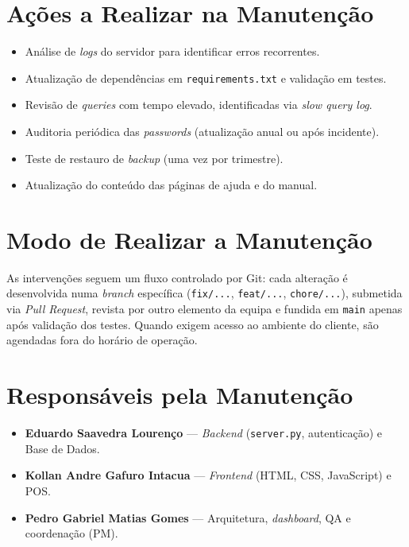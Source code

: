 \documentclass[11pt,a4paper]{report}
\begin{document}
\section{Ações a Realizar na Manutenção}
\begin{itemize}
  \item Análise de \textit{logs} do servidor para identificar erros recorrentes.
  \item Atualização de dependências em \texttt{requirements.txt} e validação em testes.
  \item Revisão de \textit{queries} com tempo elevado, identificadas via \textit{slow query log}.
  \item Auditoria periódica das \textit{passwords} (atualização anual ou após incidente).
  \item Teste de restauro de \textit{backup} (uma vez por trimestre).
  \item Atualização do conteúdo das páginas de ajuda e do manual.
\end{itemize}

\section{Modo de Realizar a Manutenção}
As intervenções seguem um fluxo controlado por Git: cada alteração é desenvolvida numa \textit{branch} específica (\texttt{fix/...}, \texttt{feat/...}, \texttt{chore/...}), submetida via \textit{Pull Request}, revista por outro elemento da equipa e fundida em \texttt{main} apenas após validação dos testes. Quando exigem acesso ao ambiente do cliente, são agendadas fora do horário de operação.

\section{Responsáveis pela Manutenção}

\begin{itemize}
  \item \textbf{Eduardo Saavedra Lourenço} --- \textit{Backend} (\texttt{server.py}, autenticação) e Base de Dados.
  \item \textbf{Kollan Andre Gafuro Intacua} --- \textit{Frontend} (HTML, CSS, JavaScript) e POS.
  \item \textbf{Pedro Gabriel Matias Gomes} --- Arquitetura, \textit{dashboard}, QA e coordenação (PM).
\end{itemize}

\end{document}
